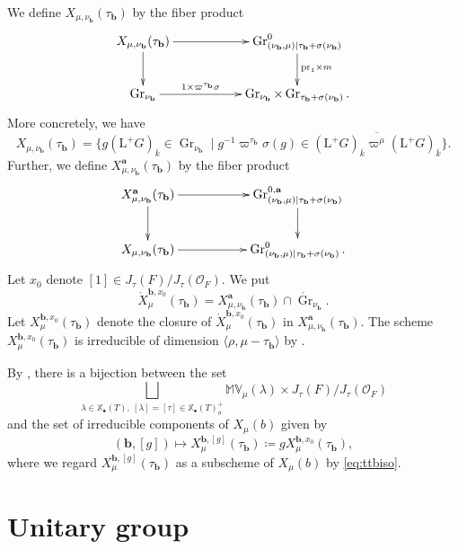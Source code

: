 \documentclass[12pt,a4paper]{article}
\DeclareMathOperator{\Gr}{Gr}
\newcommand{\bX}{\mathbb{X}}
\newcommand{\bfa}{\mathbf{a}}
\newcommand{\bfb}{\mathbf{b}}
\newcommand{\cO}{\mathcal{O}}
\newcommand{\rL}{\mathrm{L}}
\newcommand{\ol}{\overline}
\newcommand{\bMV}{\mathbb{MV}}
\begin{document}
We define $X_{\mu,\nu_{\bfb}}(\tau_{\bfb})$ by 
the fiber product 
 \[
 \xymatrix{
 X_{\mu,\nu_{\bfb}}(\tau_{\bfb})  \ar[rr]^{}  \ar[d] &     &     \Gr^{0}_{(\nu_\bfb, \mu) | \tau_{\bfb} + \sigma( \nu_\bfb) }              \ar[d]^{\mathrm{pr}_1 \times m} \\ 
 \Gr_{\nu_\bfb}  \ar[rr]^-{1 \times \varpi^{\tau_{\bfb}} \sigma }   &  &  \Gr_{\nu_\bfb} \times \Gr_{\tau_{\bfb} + \sigma( \nu_\bfb ) }.} 
\]
More concretely, we have 
\[
 X_{\mu,\nu_{\bfb}}(\tau_{\bfb}) = \{ g (\rL^+G)_{\ol{k}}  \in \Gr_{\nu_{\bfb}} \mid g^{-1} \varpi^{\tau_{\bfb}} \sigma (g) \in \overline{ (\rL^+ G)_{\ol{k}} \varpi^{\mu} (\rL^+ G)_{\ol{k}} } \}.
\]
Further, we define $X_{\mu,\nu_{\bfb}}^{\bfa}(\tau_{\bfb})$ by 
the fiber product 
 \[
 \xymatrix{
 X_{\mu,\nu_{\bfb}}^{\bfa}(\tau_{\bfb})  \ar[rr]^{}  \ar[d] &     &     \Gr^{0,\bfa}_{(\nu_\bfb, \mu) | \tau_{\bfb} + \sigma( \nu_\bfb) }              \ar[d] \\ 
 X_{\mu,\nu_{\bfb}}(\tau_{\bfb})  \ar[rr]   &  &  \Gr^{0}_{(\nu_\bfb, \mu) | \tau_{\bfb} + \sigma( \nu_\bfb) }.} 
\]
Let $x_0$ denote $[1] \in J_{\tau}(F)/J_{\tau}(\cO_F)$. 
We put 
\[
 \mathring{X}_{\mu}^{\bfb,x_0}(\tau_{\bfb}) = 
 X_{\mu,\nu_{\bfb}}^{\bfa}(\tau_{\bfb}) \cap 
 \mathring{\Gr}_{\nu_{\bfb}}. 
\]
Let $X_{\mu}^{\bfb,x_0}(\tau_{\bfb})$ 
denote the closure of 
$\mathring{X}_{\mu}^{\bfb,x_0}(\tau_{\bfb})$ 
in $X_{\mu,\nu_{\bfb}}^{\bfa}(\tau_{\bfb})$. 
The scheme $X_{\mu}^{\bfb,x_0}(\tau_{\bfb})$ is irreducible of dimension $\langle \rho, \mu -\tau_{\bfb} \rangle$ by \cite[Theorem 4.4.5]{XiZhCycSh}. 

By \cite[Theorem 4.4.14]{XiZhCycSh}, 
there is a bijection between the set
\[
 \bigsqcup_{\lambda \in  \bX_{\bullet}(T),\ [\lambda]=[\tau] \in \bX_{\bullet}(T)_{\sigma}^+}  \bMV_{\mu}(\lambda) \times J_{\tau}(F)/J_{\tau}(\cO_F) 
\] 
and the set of irreducible components of $X_{\mu}(b)$ given by 
\[
 (\bfb,[g]) \mapsto X_{\mu}^{\bfb,[g]}(\tau_{\bfb}) 
 \coloneqq 
 g X_{\mu}^{\bfb,x_0}(\tau_{\bfb}), 
\]
where we regard $X_{\mu}^{\bfb,[g]}(\tau_{\bfb})$ 
as a subscheme of $X_{\mu}(b)$ by \eqref{eq:ttbiso}. 



\section{Unitary group}\label{sec:Uni}
\end{document}

